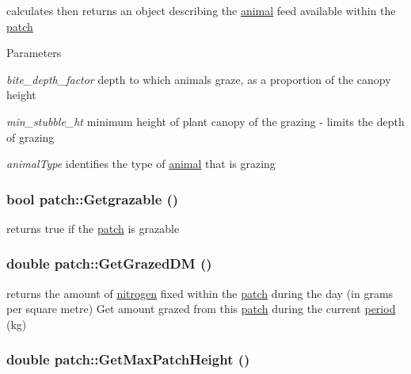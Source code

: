 calculates then returns an object describing the \hyperlink{classanimal}{animal} feed available within the \hyperlink{classpatch}{patch} 
\begin{DoxyParams}{Parameters}
\item[{\em bite\_\-depth\_\-factor}]depth to which animals graze, as a proportion of the canopy height \item[{\em min\_\-stubble\_\-ht}]minimum height of plant canopy of the grazing -\/ limits the depth of grazing \item[{\em animalType}]identifies the type of \hyperlink{classanimal}{animal} that is grazing \end{DoxyParams}
\hypertarget{classpatch_a13f8cc5a183f31aefe0b6fbf313e11b9}{
\subsubsection[{Getgrazable}]{\setlength{\rightskip}{0pt plus 5cm}bool patch::Getgrazable ()}}
\label{classpatch_a13f8cc5a183f31aefe0b6fbf313e11b9}


returns true if the \hyperlink{classpatch}{patch} is grazable \hypertarget{classpatch_a84e0930d2c8a6a1e7bf77ae86d6de1ab}{
\subsubsection[{GetGrazedDM}]{\setlength{\rightskip}{0pt plus 5cm}double patch::GetGrazedDM ()}}
\label{classpatch_a84e0930d2c8a6a1e7bf77ae86d6de1ab}


returns the amount of \hyperlink{classnitrogen}{nitrogen} fixed within the \hyperlink{classpatch}{patch} during the day (in grams per square metre) Get amount grazed from this \hyperlink{classpatch}{patch} during the current \hyperlink{classperiod}{period} (kg) \hypertarget{classpatch_a8f26f5ceb1577598a3230d8abff14cc4}{
\subsubsection[{GetMaxPatchHeight}]{\setlength{\rightskip}{0pt plus 5cm}double patch::GetMaxPatchHeight ()}}
\label{classpatch_a8f26f5ceb1577598a3230d8abff14cc4}


